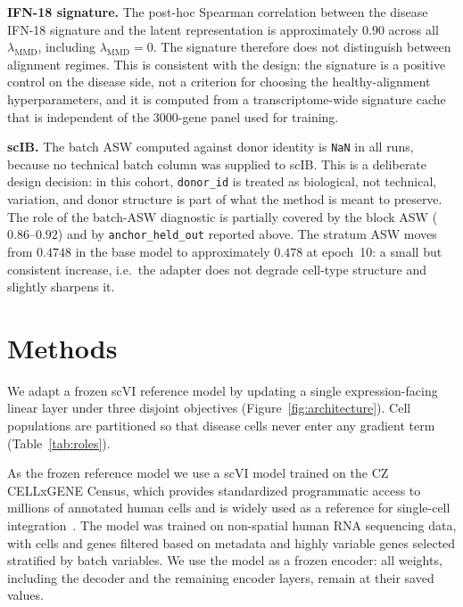 \documentclass[12pt, a4paper]{article}
\begin{document}
\textbf{IFN-18 signature.} The post-hoc Spearman correlation between the
disease IFN-18 signature and the latent representation is approximately
\(0.90\) across all \(\lambda_{\text{MMD}}\), including
\(\lambda_{\text{MMD}}=0\). The signature therefore does not distinguish
between alignment regimes. This is consistent with the design: the
signature is a positive control on the disease side, not a criterion for
choosing the healthy-alignment hyperparameters, and it is computed from
a transcriptome-wide signature cache that is independent of the 3000-gene
panel used for training.

\textbf{scIB.} The batch ASW computed against donor identity is
\texttt{NaN} in all runs, because no technical batch column was supplied
to scIB. This is a deliberate design decision: in this cohort,
\texttt{donor\_id} is treated as biological, not technical, variation,
and donor structure is part of what the method is meant to preserve.
The role of the batch-ASW diagnostic is partially covered by the
block ASW (\(0.86\)--\(0.92\)) and by \texttt{anchor\_held\_out} reported
above. The stratum ASW moves from \(0.4748\) in the base model to
approximately \(0.478\) at epoch~10: a small but consistent increase,
i.e.\ the adapter does not degrade cell-type structure and slightly
sharpens it.

\section{Methods}
\label{sec:methods}

We adapt a frozen scVI reference model by updating a single
expression-facing linear layer under three disjoint objectives
(Figure~\ref{fig:architecture}). Cell populations are partitioned so
that disease cells never enter any gradient term
(Table~\ref{tab:roles}).

As the frozen reference model we use a scVI model trained on the CZ
CELLxGENE Census, which provides standardized programmatic access to
millions of annotated human cells and is widely used as a reference for
single-cell integration~\cite{cellxgene_census_2023}. The model was
trained on non-spatial human RNA sequencing data, with cells and genes
filtered based on metadata and highly variable genes selected stratified
by batch variables. We use the model as a frozen encoder: all weights,
including the decoder and the remaining encoder layers, remain at their
saved values.
\end{document}
